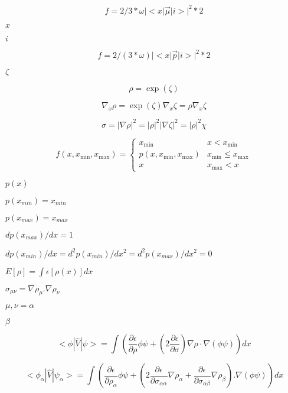 \documentclass{article}
\begin{document}
\[
f = 2/3 * \omega |<x | \vec \mu | i >| ^2 * 2
\]
\pagebreak

$ x $
\pagebreak

$ i $
\pagebreak

\[
f = 2/(3 * \omega) |<x | \vec p | i >| ^2 * 2
\]
\pagebreak

$ \zeta $
\pagebreak

\[
\rho = \exp(\zeta)
\]
\pagebreak

\[
\nabla_x\rho = \exp(\zeta)\nabla_x\zeta = \rho \nabla_x\zeta
\]
\pagebreak

\[
  \sigma = |\nabla\rho|^2 = |\rho|^2 |\nabla\zeta|^2 = |\rho|^2 \chi
\]
\pagebreak

\[
f(x,x_{\mathrm{min}},x_{\mathrm{max}}) = \left\{
  \begin{array}{ll}
    x_{\mathrm{min}}                       & x < x_{\mathrm{min}} \\
    p(x,x_{\mathrm{min}},x_{\mathrm{max}}) & x_{\mathrm{min}} \leq x_{\mathrm{max}} \\
    x                                      & x_{\mathrm{max}} < x
  \end{array}
\right.
\]
\pagebreak

$p(x)$
\pagebreak

$p(x_{min})=x_{min}$
\pagebreak

$p(x_{max})=x_{max}$
\pagebreak

$dp(x_{max})/dx=1$
\pagebreak

$dp(x_{min})/dx=d^2p(x_{min})/dx^2=d^2p(x_{max})/dx^2=0$
\pagebreak

$ E[\rho] = \int \epsilon[\rho(x)] dx$
\pagebreak

$ \sigma_{\mu \nu} = \nabla \rho_{\mu} . \nabla \rho_{\nu} $
\pagebreak

$ \mu, \nu = \alpha$
\pagebreak

$ \beta $
\pagebreak

\[
  < \phi | \hat V | \psi > = \int \left( \frac{\partial \epsilon}{\partial \rho} \phi \psi
                 +  \left( 2 \frac{\partial \epsilon}{\partial \sigma} \right)
                 \nabla \rho \cdot \nabla \left( \phi \psi \right) \right) dx
\]
\pagebreak

\[
  < \phi_{\alpha} | \hat V | \psi_{\alpha} > = \int \left( \frac{\partial \epsilon}{\partial \rho_{\alpha}} \phi \psi
           +  \left( 2 \frac{\partial \epsilon}{\partial \sigma_{\alpha \alpha}} \nabla \rho_{\alpha}
           + \frac{\partial \epsilon}{\partial \sigma_{\alpha \beta}} \nabla \rho_{\beta}  \right) . \nabla \left( \phi \psi \right) \right) dx
\]
\pagebreak
\end{document}
